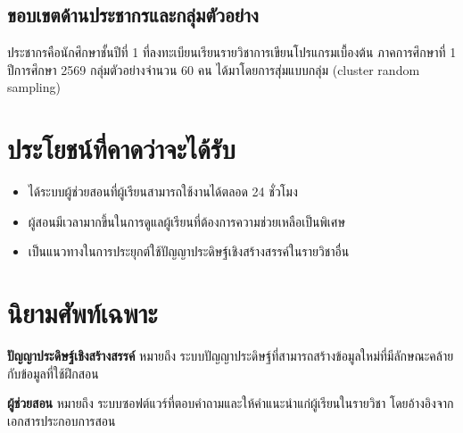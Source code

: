 \subsection{ขอบเขตด้านประชากรและกลุ่มตัวอย่าง}
ประชากรคือนักศึกษาชั้นปีที่ 1 ที่ลงทะเบียนเรียนรายวิชาการเขียนโปรแกรมเบื้องต้น ภาคการศึกษาที่ 1 ปีการศึกษา 2569 กลุ่มตัวอย่างจำนวน 60 คน ได้มาโดยการสุ่มแบบกลุ่ม (cluster random sampling)

\section{ประโยชน์ที่คาดว่าจะได้รับ}

\begin{itemize}
  \item ได้ระบบผู้ช่วยสอนที่ผู้เรียนสามารถใช้งานได้ตลอด 24 ชั่วโมง
  \item ผู้สอนมีเวลามากขึ้นในการดูแลผู้เรียนที่ต้องการความช่วยเหลือเป็นพิเศษ
  \item เป็นแนวทางในการประยุกต์ใช้ปัญญาประดิษฐ์เชิงสร้างสรรค์ในรายวิชาอื่น
\end{itemize}

\section{นิยามศัพท์เฉพาะ}

\textbf{ปัญญาประดิษฐ์เชิงสร้างสรรค์} หมายถึง ระบบปัญญาประดิษฐ์ที่สามารถสร้างข้อมูลใหม่ที่มีลักษณะคล้ายกับข้อมูลที่ใช้ฝึกสอน

\textbf{ผู้ช่วยสอน} หมายถึง ระบบซอฟต์แวร์ที่ตอบคำถามและให้คำแนะนำแก่ผู้เรียนในรายวิชา โดยอ้างอิงจากเอกสารประกอบการสอน
